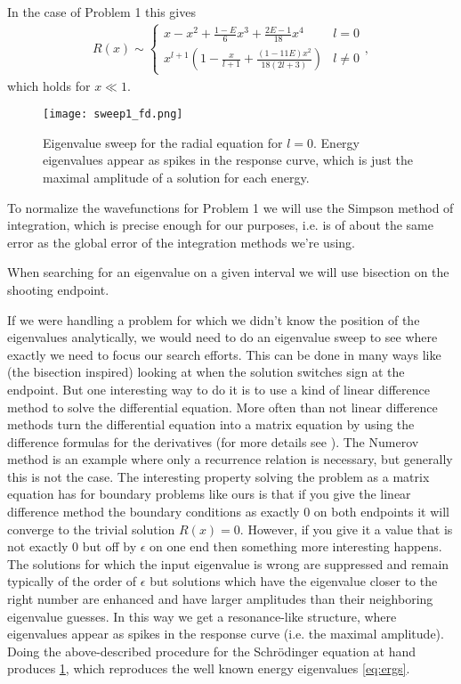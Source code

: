 \documentclass[10pt,a4paper,twocolumn]{article}
\begin{document}
In the case of Problem 1 this gives
%
\begin{align}
    R(x) \sim \begin{cases}
        x - x^2 + \frac{1 - E}{6}x^3 + \frac{2E - 1}{18}x^4 & l=0\\
        x^{l+1}\left( 1 - \frac{x}{l+1} + \frac{(1 - 11E) x^2}{18(2l+3)}\right)& l \neq 0
    \end{cases},
\end{align}
which holds for $x \ll 1$.

\begin{figure}[!h]
    \centering
    \texttt{[image: sweep1\_fd.png]}
    \caption{Eigenvalue sweep for the radial equation for $l=0$. Energy eigenvalues appear as spikes in the response curve, which is just the maximal amplitude of a solution for each energy.}
    \label{fig:sweep1_fd}
\end{figure}

To normalize the wavefunctions for Problem 1 we will use the Simpson method of integration, which is precise enough for our purposes, i.e. is of about the same error as the global error of the integration methods we're using.

When searching for an eigenvalue on a given interval we will use bisection on the shooting endpoint.

If we were handling a problem for which we didn't know the position of the eigenvalues analytically, we would need to do an eigenvalue sweep to see where exactly we need to focus our search efforts. This can be done in many ways like (the bisection inspired) looking at when the solution switches sign at the endpoint. But one interesting way to do it is to use a kind of linear difference method to solve the differential equation. More often than not linear difference methods turn the differential equation into a matrix equation by using the difference formulas for the derivatives (for more details see \cite{Zhou1993}). The Numerov method is an example where only a recurrence relation is necessary, but generally this is not the case. The interesting property solving the problem as a matrix equation has for boundary problems like ours is that if you give the linear difference method the boundary conditions as exactly $0$ on both endpoints it will converge to the trivial solution $R(x) = 0$. However, if you give it a value that is not exactly $0$ but off by $\epsilon$ on one end then something more interesting happens. The solutions for which the input eigenvalue is wrong are suppressed and remain typically of the order of $\epsilon$ but solutions which have the eigenvalue closer to the right number are enhanced and have larger amplitudes than their neighboring eigenvalue guesses. In this way we get a resonance-like structure, where eigenvalues appear as spikes in the response curve (i.e. the maximal amplitude). Doing the above-described procedure for the Schr\"odinger equation at hand produces \cref{fig:sweep1_fd}, which reproduces the well known energy eigenvalues \cref{eq:ergs}.
\end{document}
